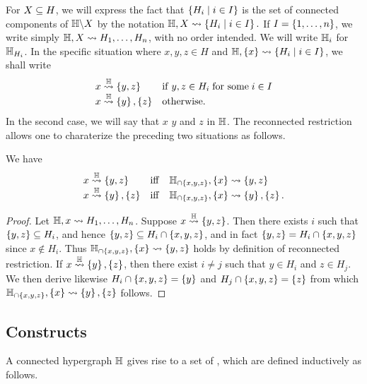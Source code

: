 For $X\subseteq H$, we will express the fact that $\left\{H_i \mid i\in I\right\}$ is the set of connected components of ${\mathbb H}\backslash X$ by the notation ${\mathbb H},X  \leadsto  \left\{H_i \mid i\in I\right\}.$
If $I=\left\{1,\ldots,n\right\}$, we write simply ${\mathbb H},X  \leadsto H_1,\ldots,H_n$, with no order intended.
We will write ${\mathbb H}_i$ for ${\mathbb H}_{H_i}$.
In the specific situation where $x,y,z\in H$ and ${\mathbb H},\left\{x\right\}\leadsto \left\{H_i \mid i\in I\right\}$, we shall write
$$\begin{array}{ll}
x\stackrel{{\mathbb H}}{\rightsquigarrow}\left\{y,z\right\} & \mathrm{if}\; y,z\in H_i\; \mbox{for some}\; i \in I\\
x\stackrel{{\mathbb H}}{\rightsquigarrow}\left\{y\right\},\left\{z\right\} & \mbox{otherwise}.
\end{array}$$
In the second case, we will say that $x$  $y$ and $z$ in ${\mathbb H}$. 
The reconnected restriction allows one to charaterize the preceding two situations as follows.

\begin{lemma} 
\label{xyz-reconnected} 
We have
$$\begin{array}{lll}
x\stackrel{{\mathbb H}}{\rightsquigarrow}\left\{y,z\right\} & \mathrm{iff} & {\mathbb H}_{\cap \left\{x,y,z\right\}},\left\{x\right\}\leadsto\left\{y,z\right\} \\
x\stackrel{{\mathbb H}}{\rightsquigarrow}\left\{y\right\},\left\{z\right\} & \mathrm{iff} & {\mathbb H}_{\cap \left\{x,y,z\right\}},\left\{x\right\}\leadsto \left\{y\right\},\left\{z\right\}.
\end{array}$$
\end{lemma}

\begin{proof} 
    Let ${\mathbb H},x\leadsto H_1,\ldots,H_n$. 
    Suppose $x\stackrel{{\mathbb H}}{\rightsquigarrow}\left\{y,z\right\}$. 
    Then there exists $i$ such that $\left\{y,z\right\}\subseteq H_i$, and hence $\left\{y,z\right\}\subseteq H_i\cap\left\{x,y,z\right\}$, and in fact $\left\{y,z\right\} = H_i\cap\left\{x,y,z\right\}$ since $x\not\in H_i$. 
    Thus ${\mathbb H}_{\cap \left\{x,y,z\right\}},\left\{x\right\}\leadsto\left\{y,z\right\}$ holds by definition of reconnected restriction.
    If $x\stackrel{{\mathbb H}}{\rightsquigarrow}\left\{y\right\},\left\{z\right\}$, then there exist $i\neq j$ such that $y\in H_i$ and $z\in H_j$. 
    We then derive likewise $H_i\cap\left\{x,y,z\right\}=\left\{y\right\}$ and $H_j\cap\left\{x,y,z\right\}=\left\{z\right\}$ from which $ {\mathbb H}_{\cap \left\{x,y,z\right\}},\left\{x\right\}\leadsto \left\{y\right\},\left\{z\right\}$ follows.
\end{proof}


\subsection{Constructs}
A {connected} hypergraph ${\mathbb H}$ gives rise to a set of , which are defined inductively as follows.
 
